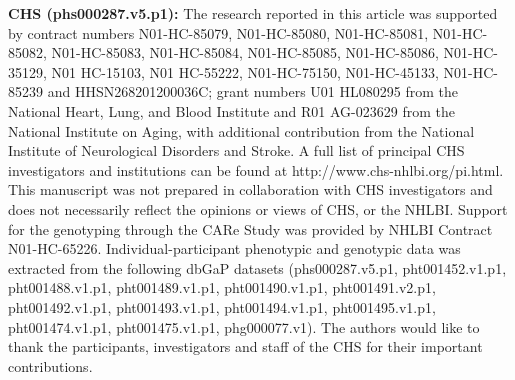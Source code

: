 \documentclass[12pt]{article}
\begin{document}
\textbf{CHS (phs000287.v5.p1):} The research reported in this article was supported by contract numbers N01-HC-85079, N01-HC-85080, N01-HC-85081, N01-HC-85082, N01-HC-85083, N01-HC-85084, N01-HC-85085, N01-HC-85086, N01-HC-35129, N01 HC-15103, N01 HC-55222, N01-HC-75150, N01-HC-45133, N01-HC-85239 and HHSN268201200036C; grant numbers U01 HL080295 from the National Heart, Lung, and Blood Institute and R01 AG-023629 from the National Institute on Aging, with additional contribution from the National Institute of Neurological Disorders and Stroke. A full list of principal CHS investigators and institutions can be found at http://www.chs-nhlbi.org/pi.html. This manuscript was not prepared in collaboration with CHS investigators and does not necessarily reflect the opinions or views of CHS, or the NHLBI. Support for the genotyping through the CARe Study was provided by NHLBI Contract N01-HC-65226. Individual-participant phenotypic and genotypic data was extracted from the following dbGaP datasets (phs000287.v5.p1, pht001452.v1.p1, pht001488.v1.p1, pht001489.v1.p1, pht001490.v1.p1, pht001491.v2.p1, pht001492.v1.p1, pht001493.v1.p1, pht001494.v1.p1, pht001495.v1.p1, pht001474.v1.p1, pht001475.v1.p1, phg000077.v1). The authors would like to thank the participants, investigators and staff of the CHS for their important contributions.
\end{document}
